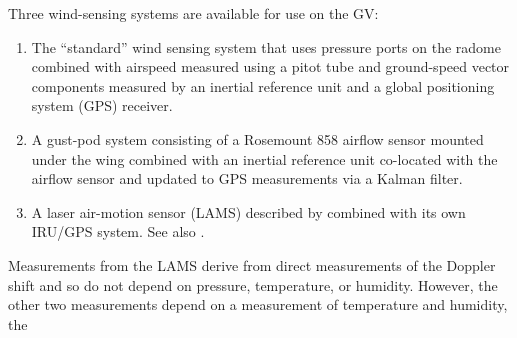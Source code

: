 \documentclass[12pt,twoside,english]{article}\usepackage[]{graphicx}\usepackage[]{color}
\let\OrgIndex\index
\renewcommand*{\index}[1]{\OrgIndex{#1}}
\begin{document}
Three wind-sensing systems are available for use on the GV:  
\begin{enumerate}
\item The ``standard'' wind sensing system that uses pressure ports on the radome combined with airspeed measured using a pitot tube and ground-speed vector components measured by an inertial reference unit and a global positioning system (GPS) receiver.  
\item A gust-pod system consisting of a Rosemount 858 airflow sensor mounted under the wing combined with an inertial reference unit co-located with the airflow sensor and updated to GPS measurements via a Kalman filter.  
\item A laser air-motion sensor (LAMS) described by \citet{SpulerEtAl2011}
combined with its own IRU/GPS system. See also \citet{CooperEtAl2014}.  
\end{enumerate}
Measurements from the LAMS derive from direct measurements of the Doppler shift
and so do not depend on pressure, temperature, or humidity. However, the other
two measurements depend on a measurement of temperature and humidity, the
\end{document}
